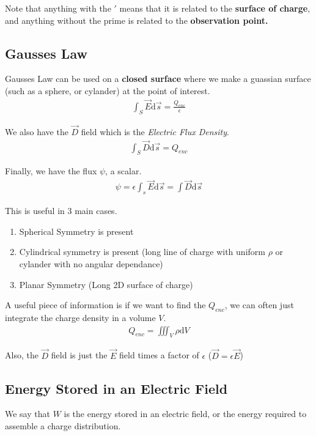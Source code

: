\documentclass[12pt,letterpaper]{article} \usepackage{amsmath} \usepackage{graphicx} \usepackage[margin=1in]{geometry} \usepackage{longtable}  \usepackage{amssymb}
\begin{document}
	Note that anything with the $\prime$ means that it is related to the \textbf{surface of charge}, and anything without the prime is related to the \textbf{observation point.}
	
	\subsection{Gausses Law}
	Gausses Law can be used on a \textbf{closed surface} where we make a guassian surface (such as a sphere, or cylander) at the point of interest. 
	\begin{align*}
		\int_S \vec E \mathrm d \vec s = \frac{Q_{enc}}{\epsilon}
	\end{align*}

	We also have the $\vec D$ field which is the \textit{Electric Flux Density}.
	\begin{align*}
		\int_S \vec D \mathrm d \vec s = Q_{enc}
	\end{align*}
	
	Finally, we have the flux $\psi$, a scalar. 
	\begin{align*}
		\psi = \epsilon \int_s \vec E \mathrm d \vec s = \int \vec D \mathrm d \vec s
	\end{align*}

	This is useful in 3 main cases. 
	\begin{enumerate}[]
		\item Spherical Symmetry is present
		\item Cylindrical symmetry is present (long line of charge with uniform $\rho$ or cylander with no angular dependance)
		\item Planar Symmetry (Long 2D surface of charge)
	\end{enumerate}

	A useful piece of information is if we want to find the $Q_{enc}$, we can often just integrate the charge density in a volume $V$.
	\begin{align*}
		Q_{enc} = \iiint_V \rho \mathrm d V
	\end{align*}

	Also, the $\vec D$ field is just the $\vec E$ field times a factor of $\epsilon$ ($\vec D = \epsilon \vec E$) 
	
	\subsection{Energy Stored in an Electric Field}
	We say that $W$ is the energy stored in an electric field, or the energy required to assemble a charge distribution. 
	
\end{document}
